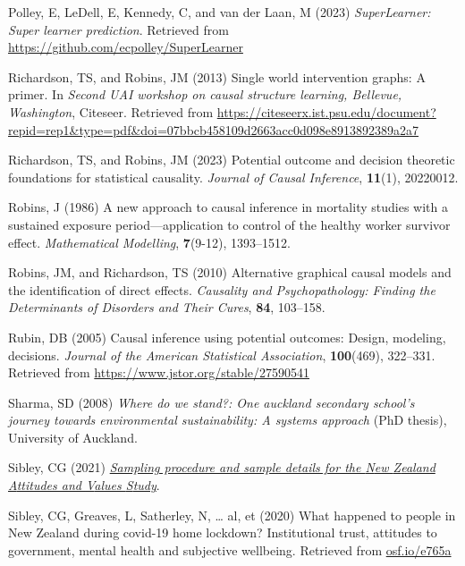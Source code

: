 \documentclass[
  single column]{article}
\newlength{\cslhangindent}
\newenvironment{CSLReferences}[2] %
 {\begin{list}{}{%
  \setlength{\itemindent}{0pt}
  \setlength{\leftmargin}{0pt}
  \setlength{\parsep}{0pt}
  \ifodd #1
   \setlength{\leftmargin}{\cslhangindent}
   \setlength{\itemindent}{-1\cslhangindent}
  \fi
  \setlength{\itemsep}{#2\baselineskip}}}
 {\end{list}}
\begin{document}
\begin{CSLReferences}{1}{0}
Polley, E, LeDell, E, Kennedy, C, and van der Laan, M (2023)
\emph{SuperLearner: Super learner prediction}. Retrieved from
\url{https://github.com/ecpolley/SuperLearner}

Richardson, TS, and Robins, JM (2013) Single world intervention graphs:
A primer. In \emph{Second UAI workshop on causal structure learning,
{B}ellevue, {W}ashington}, Citeseer. Retrieved from
\url{https://citeseerx.ist.psu.edu/document?repid=rep1&type=pdf&doi=07bbcb458109d2663acc0d098e8913892389a2a7}

Richardson, TS, and Robins, JM (2023) Potential outcome and decision
theoretic foundations for statistical causality. \emph{Journal of Causal
Inference}, \textbf{11}(1), 20220012.

Robins, J (1986) A new approach to causal inference in mortality studies
with a sustained exposure period---application to control of the healthy
worker survivor effect. \emph{Mathematical Modelling}, \textbf{7}(9-12),
1393--1512.

Robins, JM, and Richardson, TS (2010) Alternative graphical causal
models and the identification of direct effects. \emph{Causality and
Psychopathology: Finding the Determinants of Disorders and Their Cures},
\textbf{84}, 103--158.

Rubin, DB (2005) Causal inference using potential outcomes: Design,
modeling, decisions. \emph{Journal of the American Statistical
Association}, \textbf{100}(469), 322--331. Retrieved from
\url{https://www.jstor.org/stable/27590541}

Sharma, SD (2008) \emph{Where do we stand?: One auckland secondary
school's journey towards environmental sustainability: A systems
approach} (PhD thesis), University of Auckland.

Sibley, CG (2021)
\emph{\href{https://doi.org/10.31234/osf.io/wgqvy}{Sampling procedure
and sample details for the {N}ew {Z}ealand {A}ttitudes and {V}alues
{S}tudy}}.

Sibley, CG, Greaves, L, Satherley, N, \ldots{} al, et (2020) What
happened to people in {N}ew {Z}ealand during covid-19 home lockdown?
Institutional trust, attitudes to government, mental health and
subjective wellbeing. Retrieved from
\href{https://osf.io/e765a}{osf.io/e765a}


\end{CSLReferences}
\end{document}
